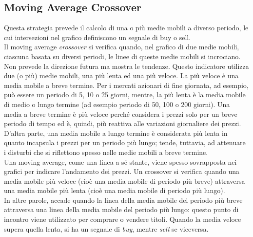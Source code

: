 \documentclass[a4paper,12pt]{report}
\begin{document}
\subsection{Moving Average Crossover}
Questa strategia prevede il calcolo di una o più medie mobili a diverso periodo, le cui intersezioni nel grafico definiscono un segnale di buy o sell.\\
Il moving average \textit{crossover} si verifica quando, nel grafico di due medie mobili, ciascuna basata su diversi periodi, le linee di queste medie mobili si incrociano.\\ Non prevede la direzione futura ma mostra le tendenze. Questo indicatore utilizza due (o più) medie mobili, una più lenta ed una più veloce. La più veloce è una media mobile a breve termine. Per i mercati azionari di fine giornata, ad esempio, può essere un periodo di 5, 10 o 25 giorni, mentre, la più lenta è la media mobile di medio o lungo termine (ad esempio periodo di 50, 100 o 200 giorni). Una media a breve termine è più veloce perché considera i prezzi solo per un breve periodo di tempo ed è, quindi, più reattiva alle variazioni giornaliere dei prezzi. D'altra parte, una media mobile a lungo termine è considerata più lenta in quanto incapsula i prezzi per un periodo più lungo; tende, tuttavia, ad attenuare i disturbi che si riflettono spesso nelle medie mobili a breve termine.
\\
Una moving average, come una linea a sé stante, viene spesso sovrapposta nei grafici per indicare l'andamento dei prezzi. Un crossover si verifica quando una media mobile più veloce (cioè una media mobile di periodo più breve) attraversa una media mobile più lenta (cioè una media mobile di periodo più lungo).\\
In altre parole, accade quando la linea della media mobile del periodo più breve attraversa una linea della media mobile del periodo più lungo: questo punto di incontro viene utilizzato per comprare o vendere titoli. Quando la media veloce supera quella lenta, si ha un segnale di \textit{buy}, mentre \textit{sell} se viceversa.\\~\\
\end{document}
